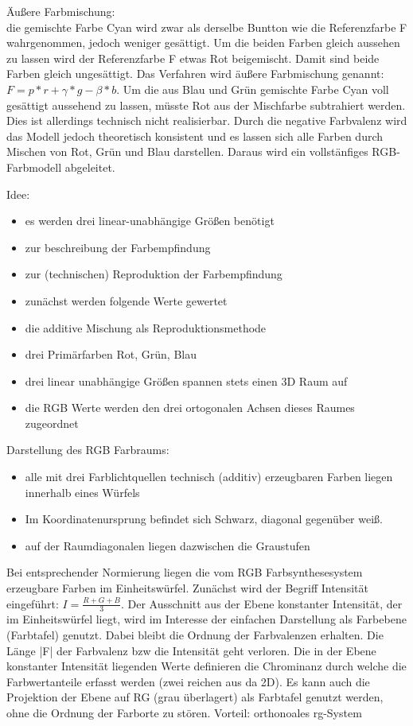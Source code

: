 \documentclass[10pt,landscape]{article}
\begin{document}
\begin{multicols}{3}
  Äußere Farbmischung:\\
  die gemischte Farbe Cyan wird zwar als derselbe Buntton wie die Referenzfarbe F wahrgenommen, jedoch weniger gesättigt. Um die beiden Farben gleich aussehen zu lassen wird der Referenzfarbe F etwas Rot beigemischt. Damit sind beide Farben gleich ungesättigt. Das Verfahren wird äußere Farbmischung genannt: $F=p*r + \gamma *g - \beta *b$.
  Um die aus Blau und Grün gemischte Farbe Cyan voll gesättigt aussehend zu lassen, müsste Rot aus der Mischfarbe subtrahiert werden. Dies ist allerdings technisch nicht realisierbar. Durch die negative Farbvalenz wird das Modell jedoch theoretisch konsistent und es lassen sich alle Farben durch Mischen von Rot, Grün und Blau darstellen. Daraus wird ein vollstänfiges RGB-Farbmodell abgeleitet.
  
  Idee:
  \begin{itemize}
    \item es werden drei linear-unabhängige Größen benötigt
    \item zur beschreibung der Farbempfindung
    \item zur (technischen) Reproduktion der Farbempfindung
    \item zunächst werden folgende Werte gewertet
    \item die additive Mischung als Reproduktionsmethode
    \item drei Primärfarben Rot, Grün, Blau
    \item drei linear unabhängige Größen spannen stets einen 3D Raum auf
    \item die RGB Werte werden den drei ortogonalen Achsen dieses Raumes zugeordnet
  \end{itemize}
  
  Darstellung des RGB Farbraums:
  \begin{itemize}
    \item alle mit drei Farblichtquellen technisch (additiv) erzeugbaren Farben liegen innerhalb eines Würfels
    \item Im Koordinatenursprung befindet sich Schwarz, diagonal gegenüber weiß.
    \item auf der Raumdiagonalen liegen dazwischen die Graustufen
  \end{itemize}
  
  Bei entsprechender Normierung liegen die vom RGB Farbsynthesesystem erzeugbare Farben im Einheitswürfel. Zunächst wird der Begriff Intensität eingeführt: $I=\frac{R+G+B}{3}$. Der Ausschnitt aus der Ebene konstanter Intensität, der im Einheitswürfel liegt, wird im Interesse der einfachen Darstellung als Farbebene (Farbtafel) genutzt. Dabei bleibt die Ordnung der Farbvalenzen erhalten. Die Länge |F| der Farbvalenz bzw die Intensität geht verloren.
  Die in der Ebene konstanter Intensität liegenden Werte definieren die Chrominanz durch welche die Farbwertanteile erfasst werden (zwei reichen aus da 2D). Es kann auch die Projektion der Ebene auf RG (grau überlagert) als Farbtafel genutzt werden, ohne die Ordnung der Farborte zu stören. Vorteil: orthonoales rg-System
  

\end{multicols}
\end{document}
